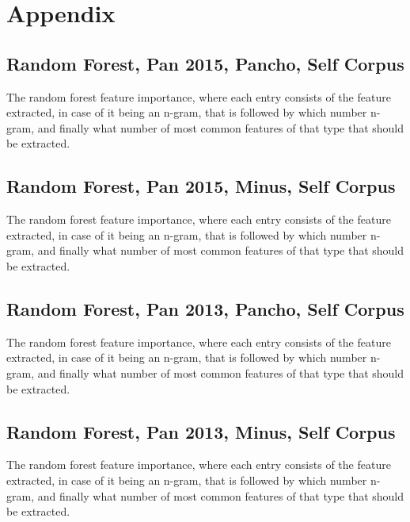\newpage
\section{Appendix}

\subsection{Random Forest, Pan 2015, Pancho, Self Corpus}
The random forest feature importance, where each entry consists of the feature extracted, in case of it being an n-gram, that is followed by which number n-gram, and finally what number of most common features of that type that should be extracted.


\subsection{Random Forest, Pan 2015, Minus, Self Corpus}
The random forest feature importance, where each entry consists of the feature extracted, in case of it being an n-gram, that is followed by which number n-gram, and finally what number of most common features of that type that should be extracted.


\subsection{Random Forest, Pan 2013, Pancho, Self Corpus}
The random forest feature importance, where each entry consists of the feature extracted, in case of it being an n-gram, that is followed by which number n-gram, and finally what number of most common features of that type that should be extracted.


\subsection{Random Forest, Pan 2013, Minus, Self Corpus}
The random forest feature importance, where each entry consists of the feature extracted, in case of it being an n-gram, that is followed by which number n-gram, and finally what number of most common features of that type that should be extracted.

